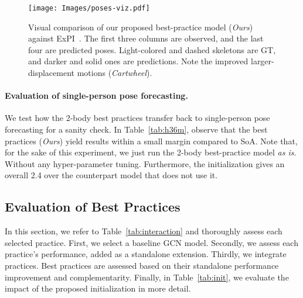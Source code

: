 \documentclass[10pt,twocolumn,letterpaper]{article}
\begin{document}
 
\begin{figure}[htbp]
    \centering
    \texttt{[image: Images/poses-viz.pdf]}

    \caption{Visual comparison of our proposed best-practice  model (\emph{Ours}) against ExPI~\cite{guo21}. The first three columns are observed, and the last four are predicted poses.
    Light-colored and dashed skeletons are GT, and darker and solid ones are predictions. Note the improved larger-displacement motions (\textit{Cartwheel}).
}
     \label{fig:poses-viz}
\end{figure}


\vspace{-.2cm}
\paragraph{Evaluation of single-person pose forecasting.}


We test how the 2-body best practices transfer back to single-person pose forecasting for a sanity check.
In Table~\ref{tab:h36m}, observe that the best practices (\emph{Ours}) yield results within a small margin compared to SoA.
Note that, for the sake of this experiment, we just run the 2-body best-practice model \emph{as is}. Without any hyper-parameter tuning. Furthermore, the initialization gives an overall 2.4 over the counterpart model that does not use it.

\subsection{Evaluation of Best Practices}\label{sec:best_discussion}

In this section, we refer to Table~\ref{tab:interaction} and thoroughly assess each selected practice. First, we select a baseline GCN model. Secondly, we assess each practice's performance, added as a standalone extension. Thirdly, we integrate practices. Best practices are assessed based on their standalone performance improvement and complementarity. Finally, in Table~\ref{tab:init}, we evaluate the impact of the proposed initialization in more detail.
\end{document}
